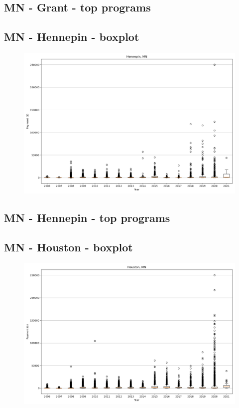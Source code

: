 \subsection*{MN - Grant - top programs}

\newpage
\subsection*{MN - Hennepin - boxplot}
\begin{figure}[h]
\centering
\includegraphics[width=7in]{../output/boxplots/counties/Hennepin-MN_boxplot.png}
\end{figure}


\subsection*{MN - Hennepin - top programs}

\newpage
\subsection*{MN - Houston - boxplot}
\begin{figure}[h]
\centering
\includegraphics[width=7in]{../output/boxplots/counties/Houston-MN_boxplot.png}
\end{figure}


